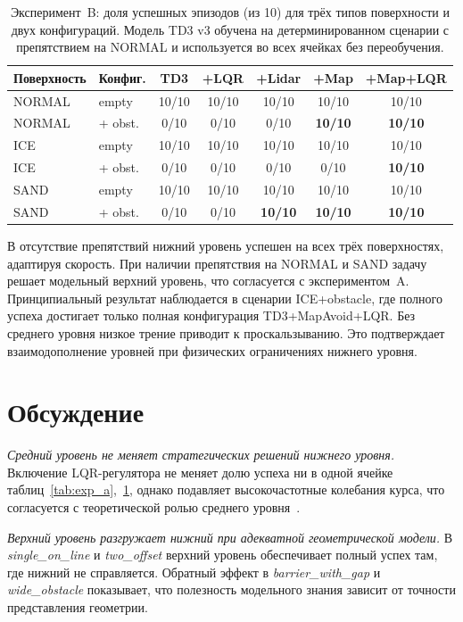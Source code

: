 \documentclass[11pt]{article}
\begin{document}
\begin{table}[h]
\begin{center}
\begin{tabular}{llccccc}
\toprule
Поверхность & Конфиг. & TD3 & +LQR & +Lidar & +Map & +Map+LQR \\
\midrule
NORMAL & empty     & 10/10 & 10/10 & 10/10 & 10/10 & 10/10 \\
NORMAL & + obst.   & 0/10  & 0/10  & 0/10  & \textbf{10/10} & \textbf{10/10} \\
ICE    & empty     & 10/10 & 10/10 & 10/10 & 10/10 & 10/10 \\
ICE    & + obst.   & 0/10  & 0/10  & 0/10  & 0/10  & \textbf{10/10} \\
SAND   & empty     & 10/10 & 10/10 & 10/10 & 10/10 & 10/10 \\
SAND   & + obst.   & 0/10  & 0/10  & \textbf{10/10}  & \textbf{10/10} & \textbf{10/10} \\
\bottomrule
\end{tabular}
\caption{Эксперимент~B: доля успешных эпизодов (из 10) для трёх типов
поверхности и двух конфигураций. Модель TD3 v3 обучена на детерминированном
сценарии с препятствием на NORMAL и используется во всех ячейках без
переобучения.}
\label{tab:exp_b}
\end{center}
\end{table}

В отсутствие препятствий нижний уровень успешен на всех трёх поверхностях, адаптируя скорость. При наличии препятствия на NORMAL и SAND задачу решает модельный верхний уровень, что согласуется с экспериментом~A. Принципиальный результат наблюдается в сценарии ICE+obstacle, где полного успеха достигает только полная конфигурация TD3+MapAvoid+LQR. Без среднего уровня низкое трение приводит к проскальзыванию. Это подтверждает взаимодополнение уровней при физических ограничениях нижнего уровня.


\section{Обсуждение}
\label{sec:discussion}

\textit{Средний уровень не меняет стратегических решений нижнего уровня.} Включение LQR-регулятора не меняет долю успеха ни в одной ячейке таблиц~\ref{tab:exp_a},~\ref{tab:exp_b}, однако подавляет высокочастотные колебания курса, что согласуется с теоретической ролью среднего уровня~\cite{kiselev2020dissertation,kiselev2020}.

\textit{Верхний уровень разгружает нижний при адекватной геометрической модели.} В \emph{single\_on\_line} и \emph{two\_offset} верхний уровень обеспечивает полный успех там, где нижний не справляется. Обратный эффект в \emph{barrier\_with\_gap} и \emph{wide\_obstacle} показывает, что полезность модельного знания зависит от точности представления геометрии.
\end{document}
